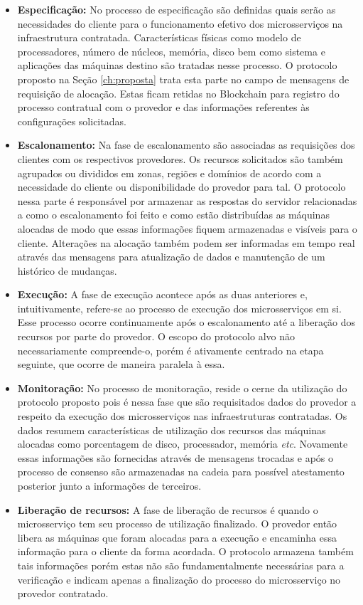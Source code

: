  
 \begin{itemize}
     \item \textbf{Especificação:}
        No processo de especificação são definidas quais serão as necessidades do cliente para o funcionamento efetivo dos microsserviços na infraestrutura contratada. Características físicas como modelo de processadores, número de núcleos, memória, disco bem como sistema e aplicações das máquinas destino são tratadas nesse processo. O protocolo proposto na Seção \ref{ch:proposta} trata esta parte no campo de mensagens de requisição de alocação. Estas ficam retidas no Blockchain para registro do processo contratual com o provedor e das informações referentes às configurações solicitadas.
     \item \textbf{Escalonamento:}
        Na fase de escalonamento são associadas as requisições dos clientes com os respectivos provedores. Os recursos solicitados são também agrupados ou divididos em zonas, regiões e domínios de acordo com a necessidade do cliente ou disponibilidade do provedor para tal. O protocolo nessa parte é responsável por armazenar as respostas do servidor relacionadas a como o escalonamento foi feito e como estão distribuídas as máquinas alocadas de modo que essas informações fiquem armazenadas e visíveis para o cliente. Alterações na alocação também podem ser informadas em tempo real através das mensagens para atualização de dados e manutenção de um histórico de mudanças.
     \item \textbf{Execução:}
        A fase de execução acontece após as duas anteriores e, intuitivamente, refere-se ao processo de execução dos microsserviços em si. Esse processo ocorre continuamente após o escalonamento até a liberação dos recursos por parte do provedor. O escopo do protocolo alvo não necessariamente compreende-o, porém é ativamente centrado na etapa seguinte, que ocorre de maneira paralela à essa.
     \item \textbf{Monitoração:}
        No processo de monitoração, reside o cerne da utilização do protocolo proposto pois é nessa fase que são requisitados dados do provedor a respeito da execução dos microsserviços nas infraestruturas contratadas. Os dados resumem características de utilização dos recursos das máquinas alocadas como porcentagem de disco, processador, memória \textit{etc}. Novamente essas informações são fornecidas através de mensagens trocadas e após o processo de consenso são armazenadas na cadeia para possível atestamento posterior junto a informações de terceiros.
     \item \textbf{Liberação de recursos:} A fase de liberação de recursos é quando o microsserviço tem seu processo de utilização finalizado. O provedor então libera as máquinas que foram alocadas para a execução e encaminha essa informação para o cliente da forma acordada. O protocolo armazena também tais informações porém estas não são fundamentalmente necessárias para a verificação e indicam apenas a finalização do processo do microsserviço no provedor contratado.
 \end{itemize}
 
